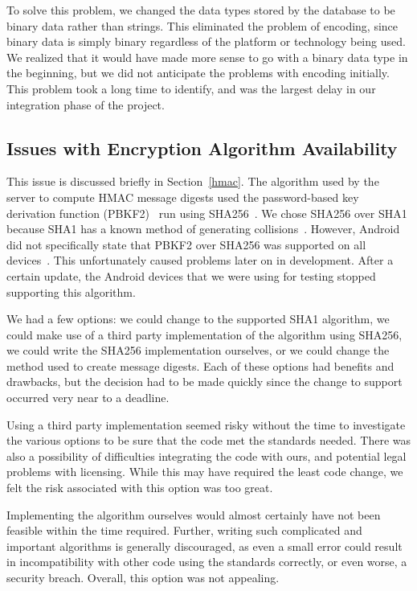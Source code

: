 \documentclass[12pt]{report}
\let\Oldsubsection\subsection
\renewcommand{\subsection}{\FloatBarrier\Oldsubsection}
\begin{document}
To solve this problem, we changed the data types stored by the database to be binary data
rather than strings. This eliminated the problem of encoding, since binary data is simply binary
regardless of the platform or technology being used. We realized that it would have made more
sense to go with a binary data type in the beginning, but we did not anticipate the problems with
encoding initially. This problem took a long time to identify, and was the largest delay in our
integration phase of the project.

\subsection{Issues with Encryption Algorithm Availability} \label{issues-with-encryption-algorithm-availability}

This issue is discussed briefly in Section~\ref{hmac}. The algorithm used by the server to compute HMAC message digests
used the password-based key derivation function (PBKF2)~\autocite{RFC6070} run using SHA256~\autocite{RFC4634}. We chose
SHA256 over SHA1 because SHA1 has a known method of generating collisions~\autocite{SHA1COLLISION}. However, Android
did not specifically state that PBKF2 over SHA256 was supported on all devices~\autocite{ANDROIDKEYFACTORY}. This
unfortunately caused problems later on in development. After a certain update, the Android devices that we were using
for testing stopped supporting this algorithm.

We had a few options: we could change to the supported SHA1 algorithm, we could make use of a third party implementation
of the algorithm using SHA256, we could write the SHA256 implementation ourselves, or we could change the method used to
create message digests. Each of these options had benefits and drawbacks, but the decision had to be made quickly since
the change to support occurred very near to a deadline.

Using a third party implementation seemed risky without the time to investigate the various options to be sure that the
code met the standards needed. There was also a possibility of difficulties integrating the code with ours, and
potential legal problems with licensing. While this may have required the least code change, we felt the risk
associated with this option was too great.

Implementing the algorithm ourselves would almost certainly have not been feasible within the time required. Further,
writing such complicated and important algorithms is generally discouraged, as even a small error could result in
incompatibility with other code using the standards correctly, or even worse, a security breach. Overall, this option
was not appealing.
\end{document}
